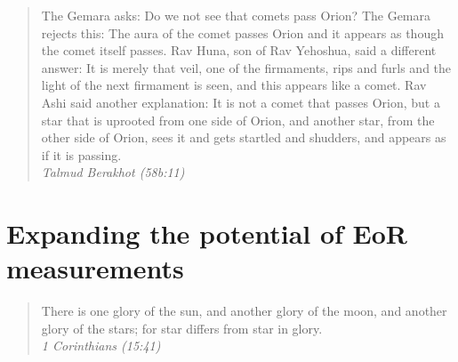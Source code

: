 \documentclass[12pt,twoside,openany]{book}
\begin{document}
\vspace*{\fill} 
\begin{quote} 
\centering 
The Gemara asks: Do we not see that comets pass Orion? The Gemara rejects this: The aura of the comet passes Orion and it appears as though the comet itself passes. Rav Huna, son of Rav Yehoshua, said a different answer: It is merely that veil, one of the firmaments, rips and furls and the light of the next firmament is seen, and this appears like a comet. Rav Ashi said another explanation: It is not a comet that passes Orion, but a star that is uprooted from one side of Orion, and another star, from the other side of Orion, sees it and gets startled and shudders, and appears as if it is passing.\\

\textit{Talmud Berakhot (58b:11)}
\end{quote}
\vspace*{\fill}


%
%
%

%
%
%

%
%

% 
%

%
%
%

%
%
%

%
%
%
\part{Expanding the potential of EoR measurements}


\vspace*{\fill} 
\begin{quote} 
\centering 
There is one glory of the sun, and another glory of the moon, and another glory of the stars; for star differs from star in glory. \\
\textit{1 Corinthians (15:41)}
\end{quote}
\vspace*{\fill}
\end{document}
